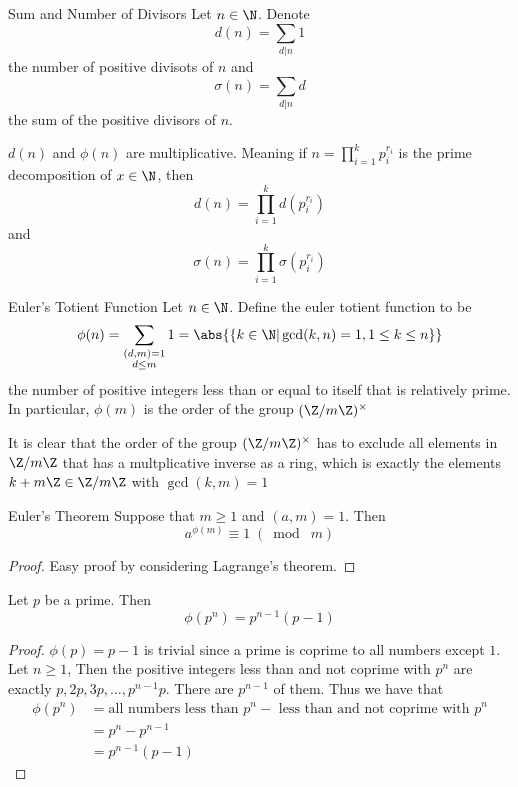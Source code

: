 \documentclass[a4paper]{article}
\begin{document}
\begin{defn}{Sum and Number of Divisors}{} Let $n\in\N$. Denote $$d(n)=\sum_{d|n}1$$ the number of positive divisots of $n$ and $$\sigma(n)=\sum_{d|n}d$$ the sum of the positive divisors of $n$. 
\end{defn}

\begin{thm}{}{} $d(n)$ and $\phi(n)$ are multiplicative. Meaning if $n=\prod_{i=1}^kp_i^{r_i}$ is the prime decomposition of $x\in\N$, then $$d(n)=\prod_{i=1}^kd(p_i^{r_i})$$ and $$\sigma(n)=\prod_{i=1}^k\sigma(p_i^{r_i})$$
\end{thm}

\begin{defn}{Euler's Totient Function}{} Let $n\in\N$. Define the euler totient function to be $$\phi(n)=\sum_{\substack{(d,m)=1\\d\leq m}}1=\abs{\{k\in\N|\gcd(k,n)=1,1\leq k\leq n\}}$$ the number of positive integers less than or equal to itself that is relatively prime. In particular, $\phi(m)$ is the order of the group $(\Z/m\Z)^\times$
\end{defn}

It is clear that the order of the group $(\Z/m\Z)^\times$ has to exclude all elements in $\Z/m\Z$ that has a multplicative inverse as a ring, which is exactly the elements $k+m\Z\in\Z/m\Z$ with $\gcd(k,m)=1$

\begin{thm}{Euler's Theorem}{} Suppose that $m\geq 1$ and $(a,m)=1$. Then $$a^{\phi(m)}\equiv 1\;(\bmod\;m)$$\tcbline\begin{proof}
Easy proof by considering Lagrange's theorem. 
\end{proof}
\end{thm}

\begin{lmm}{}{} Let $p$ be a prime. Then $$\phi(p^n)=p^{n-1}(p-1)$$\tcbline
\begin{proof}
$\phi(p)=p-1$ is trivial since a prime is coprime to all numbers except $1$. Let $n\geq 1$, Then the positive integers less than and not coprime with $p^n$ are exactly $p,2p,3p,\dots,p^{n-1}p$. There are $p^{n-1}$ of them. Thus we have that 
\begin{align*}
\phi(p^n)&=\text{all numbers less than }p^n-\text{ less than and not coprime with }p^n\\
&=p^n-p^{n-1}\\
&=p^{n-1}(p-1)
\end{align*}
\end{proof}
\end{lmm}
\end{document}
